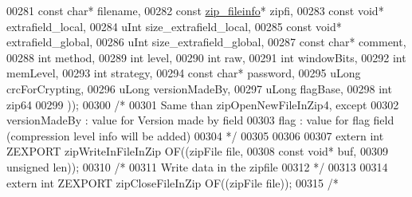 \begin{DoxyCode}
00281                                             \textcolor{keyword}{const} \textcolor{keywordtype}{char}* filename,
00282                                             \textcolor{keyword}{const} \hyperlink{structzip__fileinfo}{zip\_fileinfo}* zipfi,
00283                                             \textcolor{keyword}{const} \textcolor{keywordtype}{void}* extrafield\_local,
00284                                             uInt size\_extrafield\_local,
00285                                             \textcolor{keyword}{const} \textcolor{keywordtype}{void}* extrafield\_global,
00286                                             uInt size\_extrafield\_global,
00287                                             \textcolor{keyword}{const} \textcolor{keywordtype}{char}* comment,
00288                                             \textcolor{keywordtype}{int} method,
00289                                             \textcolor{keywordtype}{int} level,
00290                                             \textcolor{keywordtype}{int} raw,
00291                                             \textcolor{keywordtype}{int} windowBits,
00292                                             \textcolor{keywordtype}{int} memLevel,
00293                                             \textcolor{keywordtype}{int} strategy,
00294                                             \textcolor{keyword}{const} \textcolor{keywordtype}{char}* password,
00295                                             uLong crcForCrypting,
00296                                             uLong versionMadeBy,
00297                                             uLong flagBase,
00298                                             \textcolor{keywordtype}{int} zip64
00299                                             ));
00300 \textcolor{comment}{/*}
00301 \textcolor{comment}{  Same than zipOpenNewFileInZip4, except}
00302 \textcolor{comment}{    versionMadeBy : value for Version made by field}
00303 \textcolor{comment}{    flag : value for flag field (compression level info will be added)}
00304 \textcolor{comment}{ */}
00305 
00306 
00307 \textcolor{keyword}{extern} \textcolor{keywordtype}{int} ZEXPORT zipWriteInFileInZip OF((zipFile file,
00308                        \textcolor{keyword}{const} \textcolor{keywordtype}{void}* buf,
00309                        \textcolor{keywordtype}{unsigned} len));
00310 \textcolor{comment}{/*}
00311 \textcolor{comment}{  Write data in the zipfile}
00312 \textcolor{comment}{*/}
00313 
00314 \textcolor{keyword}{extern} \textcolor{keywordtype}{int} ZEXPORT zipCloseFileInZip OF((zipFile file));
00315 \textcolor{comment}{/*}

\end{DoxyCode}
